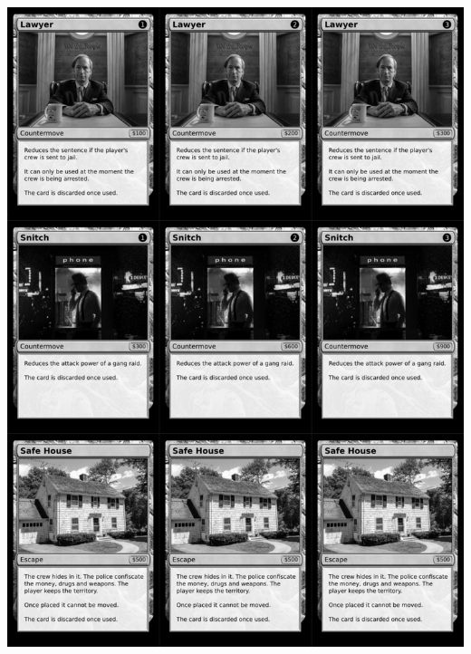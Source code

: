 \documentclass[a4paper]{article}
\begin{document}
\newpage

\begin{center}
	\centering
	\includegraphics[width=200.5mm,height=280.7mm]{output/temp/page33.png}
\end{center}
\end{document}
